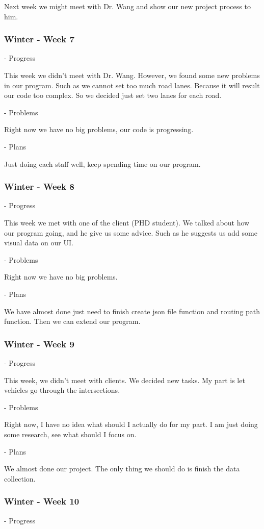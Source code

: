 \documentclass[onecolumn, draftclsnofoot,10pt, compsoc]{IEEEtran}
\begin{document}
Next week we might meet with Dr. Wang and show our new project process to him.
\subsubsection{Winter - Week 7}
- Progress

This week we didn't meet with Dr. Wang.
However, we found some new problems in our program.
Such as we cannot set too much road lanes.
Because it will result our code too complex.
So we decided just set two lanes for each road.

- Problems

Right now we have no big problems, our code is progressing.

- Plans

Just doing each staff well, keep spending time on our program.
\subsubsection{Winter - Week 8}
- Progress

This week we met with one of the client (PHD student).
We talked about how our program going, and he give us some advice.
Such as he suggests us add some visual data on our UI.

- Problems

Right now we have no big problems.

- Plans

We have almost done just need to finish create json file function and routing path function.
Then we can extend our program.
\subsubsection{Winter - Week 9}
- Progress

This week, we didn't meet with clients.
We decided new tasks.
My part is let vehicles go through the intersections.

- Problems

Right now, I have no idea what should I actually do for my part.
I am just doing some research, see what should I focus on.

- Plans

We almost done our project.
The only thing we should do is finish the data collection.
\subsubsection{Winter - Week 10}
- Progress
\end{document}

